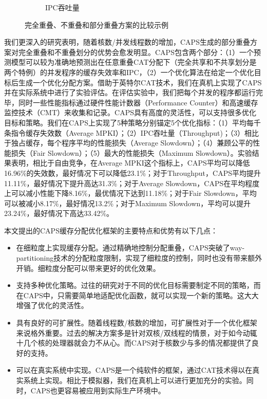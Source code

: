 \begin{figure}[htbp]
\begin{subfigure}[b]{0.4\linewidth}
        \caption{IPC吞吐量}
    \end{subfigure}
    \caption{完全重叠、不重叠和部分重叠方案的比较示例}
    \label{fig:illustration}
\end{figure}

我们更深入的研究表明，随着核数/并发线程数的增加，CAPS生成的部分重叠方案对完全重叠和不重叠划分的优势会愈发明显。CAPS包含两个部分：（1）一个预测模型可以较为准确地预测出在任意重叠CAT分配下（完全共享和不共享划分是两个特例）的并发程序的缓存失效率和IPC，（2）一个优化算法在给定一个优化目标后生成一个优化分配方案。借助于英特尔CAT技术，我们在真机上实现了CAPS并在实际系统中进行了实验评估。在评估实验中，我们把每个并发的程序都运行完毕，同时一些性能指标通过硬件性能计数器（Performance Counter）和高速缓存监控技术（CMT）来收集和记录。CAPS具有高度的灵活性，可以支持很多优化目标和策略。我们在CAPS上实现了5种策略分别锚定5个优化指标：（1）平均每千条指令缓存失效数（Average MPKI）；（2）IPC吞吐量（Throughput)；（3）相比于独占缓存，每个程序平均的性能损失（Average Slowdown）；（4）兼顾公平的性能损失（Fair Slowdown）；（5）最大的性能损失（Maximum Slowdown）。实验结果表明，相比于自由竞争，在Average MPKI这个指标上，CAPS平均可以降低16.96\%的失效数，最好情况下可以降低23.1\%；对于Throughput，CAPS平均提升11.11\%，最好情况下提升高达31.3\%；对于Average Slowdown，CAPS在平均程度上可以减小性能下降8.16\%，最优情况下达到11.18\%；对于Fair Slowdown，平均可以被减小8.17\%，最好情况13.2\%；对于Maximum Slowdown，平均可以提升23.24\%，最好情况下高达33.42\%。

本文提出的CAPS缓存分配优化框架的主要特点和优势有以下几点：

\begin{itemize}
    \item 在细粒度上实现缓存分配。通过精确地控制分配重叠，CAPS突破了way-partitioning技术的分配粒度限制，实现了细粒度的控制，同时也没有带来额外开销。细粒度分配可以带来更好的优化效果。
    \item 支持多种优化策略。过往的研究对于不同的优化目标需要制定不同的策略，而在CAPS中，只需要简单地适配优化函数，就可以实现一个新的策略。这大大增强了优化的灵活性。
    \item 具有良好的可扩展性。随着线程数/核数的增加，可扩展性对于一个优化框架来说格外重要。过去的解决方案多是针对双核/双线程的情景，对于如今动辄十几个核的处理器就会力不从心。而CAPS对于核数少与多的情况都提供了良好的支持。
    \item 可以在真实系统中实现。CAPS是一个纯软件的框架，通过CAT技术得以在真实系统上实现。相比于模拟器，我们在真机上可以进行更加充分的实验。同时，CAPS也更容易被应用到实际生产环境中。
\end{itemize}


